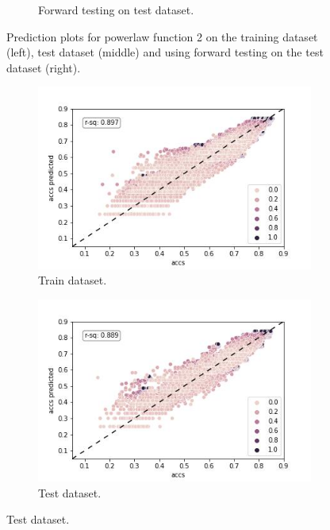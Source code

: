\documentclass{article} %
\begin{document}
\begin{figure}
\begin{subfigure}{.33\textwidth}
        \caption{Forward testing on test dataset.}
        \label{fig:powerlaw_acc_total_n_epoch_forward_val}
    \end{subfigure}
    \caption{Prediction plots for powerlaw function 2 on the training dataset (left), test dataset (middle) and using forward testing on the test dataset (right).}
    \label{fig:powerlaw_prediction_plot_fct_2}
\end{figure}


\begin{figure}
    \begin{subfigure}{.33\textwidth}
        \centering
        \includegraphics[width=.8\linewidth]{cifar10/powerlaw_all_epochs_accs_hat_total_n_arctan_epoch_arctan.jpg}
        \caption{Train dataset.}
        \label{fig:powerlaw_acc_total_n_arctan_epoch_arctan_train}
    \end{subfigure}%
    \begin{subfigure}{.33\textwidth}
        \centering
        \includegraphics[width=.8\linewidth]{cifar10/powerlaw_all_epochs_accs_hat_total_n_arctan_epoch_arctan_val.jpg}
        \caption{Test dataset.}
        \label{fig:powerlaw_acc_total_n_arctan_epoch_arctan_val}
    \end{subfigure}

\end{figure}
\end{document}
